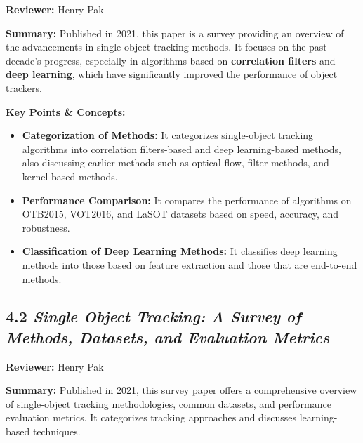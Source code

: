 \documentclass{article}
\begin{document}
\hspace*{\parindent}\textbf{Reviewer:} Henry Pak

\vspace{0.3cm}

\textbf{Summary:} Published in 2021, this paper is a survey providing an overview of the advancements in single-object tracking methods. It focuses on the past decade's progress, especially in algorithms based on \textbf{correlation filters} and \textbf{deep learning}, which have significantly improved the performance of object trackers.

\vspace{0.3cm}

\textbf{Key Points \& Concepts:}
\begin{itemize}
  \item \textbf{Categorization of Methods:} It categorizes single-object tracking algorithms into correlation filters-based and deep learning-based methods, also discussing earlier methods such as optical flow, filter methods, and kernel-based methods.
  \item \textbf{Performance Comparison:} It compares the performance of algorithms on OTB2015, VOT2016, and LaSOT datasets based on speed, accuracy, and robustness.
  \item \textbf{Classification of Deep Learning Methods:} It classifies deep learning methods into those based on feature extraction and those that are end-to-end methods.
\end{itemize}

\subsection*{4.2 \textit{Single Object Tracking: A Survey of Methods, Datasets, and Evaluation Metrics}}

\hspace*{\parindent}\textbf{Reviewer:} Henry Pak

\vspace{0.3cm}

\textbf{Summary:} Published in 2021, this survey paper offers a comprehensive overview of single-object tracking methodologies, common datasets, and performance evaluation metrics. It categorizes tracking approaches and discusses learning-based techniques.

\vspace{0.3cm}
\end{document}
